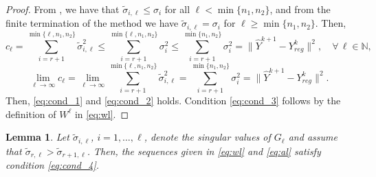 \documentclass[pdflatex,sn-mathphys-num]{sn-jnl}
\numberwithin{equation}{section}%
\newcommand{\norm}[1]{\| #1 \|}
\newcommand{\Yck}{{Y_{reg}^k}}
\newcommand{\cZ}{G}
\theoremstyle{thmstyleone}%
\newtheorem{lemma}[theorem]{Lemma}%
\theoremstyle{thmstyletwo}%
\theoremstyle{thmstylethree}%
\begin{document}
\begin{proof}
From \cite[Theorem 6.4]{saad2011numerical}, we have that $\tilde \sigma_{i,\ell} \le \sigma_i$ for all $\ell<\min\{n_1,n_2\}$, and from the finite termination of the method we have $\tilde \sigma_{i,\ell} =\sigma_i$ for $\ell\geq \min\{n_1, n_2\}$. Then, 
\[
c_\ell = \sum_{i=r+1}^{\min\{\ell,n_1,n_2\}} \tilde \sigma_{i,\ell}^2 
       \le \sum_{i=r+1}^{\min\{\ell,n_1,n_2\}} \sigma_{i}^2 
       \le \sum_{i=r+1}^{\min\{n_1, n_2\}} \sigma_{i}^2 
       = \norm{\hat Y^{k+1} - \Yck}^2, \quad \forall \, \ell\in\mathbb{N},
\]
\[
    \lim_{\ell \rightarrow \infty} c_\ell = \lim_{\ell \rightarrow \infty} \sum_{i=r+1}^{\min\{\ell,n_1,n_2\}} \tilde \sigma_{i,\ell}^2     = \sum_{i=r+1}^{\min\{n_1, n_2\}} \sigma_{i}^2 = \norm{\hat Y^{k+1} - \Yck}^2.
\]
Then, \eqref{eq:cond_1} and \eqref{eq:cond_2} holds. {Condition \eqref{eq:cond_3} follows by the definition of $W^{\ell}$ in \eqref{eq:wl}.}
\end{proof}

\begin{lemma}
{Let $\tilde \sigma_{i,\ell}$, $i=1,\ldots,\ell$, denote the singular values of $\cZ_\ell$ and assume that $\tilde\sigma_{r,\ell}  > \tilde\sigma_{r+1,\ell}$.} Then, the sequences given {in \eqref{eq:wl}} and \eqref{eq:al} satisfy condition \eqref{eq:cond_4}.
\end{lemma}
\end{document}
